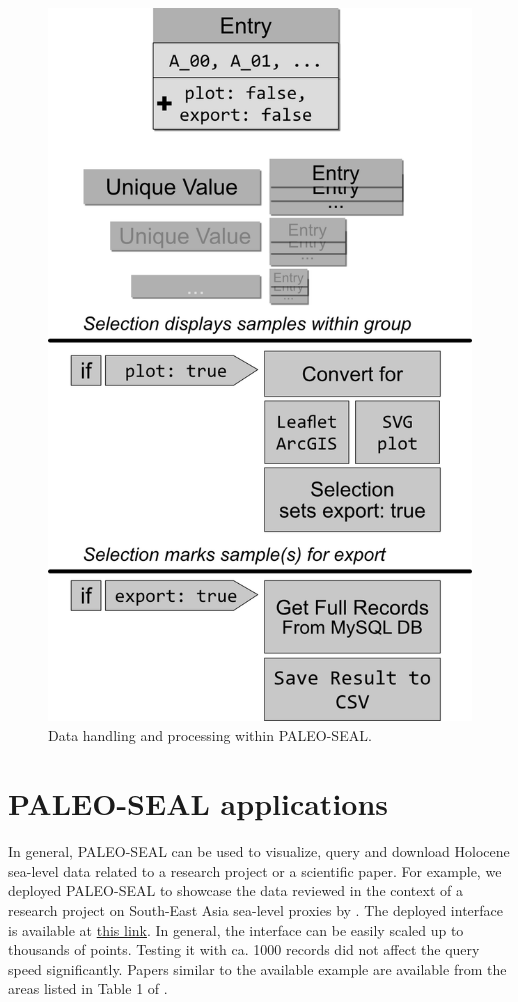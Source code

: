 \documentclass[a4paper,fleqn]{cas-dc}
\begin{document}
\begin{figure}[]
	\includegraphics{figs/FigureTechnical.png}
	\caption{Data handling and processing within PALEO-SEAL.}
	\label{fig:3}
\end{figure}

\section{PALEO-SEAL applications}
In general, PALEO-SEAL can be used to visualize, query and download Holocene sea-level data related to a research project or a scientific paper. For example, we deployed PALEO-SEAL to showcase the data reviewed in the context of a research project on South-East Asia sea-level proxies by \citet{mann2019holocene}. The deployed interface is available at \href{https://warmcoasts.eu/paleo-seal/}{this link}. In general, the interface can be easily scaled up to thousands of points. Testing it with ca. 1000 records did not affect the query speed significantly. Papers similar to the available example are available from the areas listed in Table 1 of \citet{khan2019}. 
\end{document}
